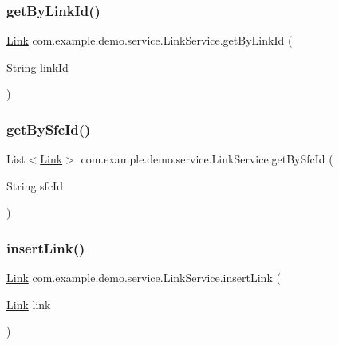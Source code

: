 \subsubsection{\texorpdfstring{get\+By\+Link\+Id()}{getByLinkId()}}
{\footnotesize\ttfamily \mbox{\hyperlink{classcom_1_1example_1_1demo_1_1modular_1_1_link}{Link}} com.\+example.\+demo.\+service.\+Link\+Service.\+get\+By\+Link\+Id (\begin{DoxyParamCaption}\item[{String}]{link\+Id }\end{DoxyParamCaption})}

\mbox{\label{classcom_1_1example_1_1demo_1_1service_1_1_link_service_a5b02639405e897a0f429ad1cc0e54990}} 
\subsubsection{\texorpdfstring{get\+By\+Sfc\+Id()}{getBySfcId()}}
{\footnotesize\ttfamily List$<$\mbox{\hyperlink{classcom_1_1example_1_1demo_1_1modular_1_1_link}{Link}}$>$ com.\+example.\+demo.\+service.\+Link\+Service.\+get\+By\+Sfc\+Id (\begin{DoxyParamCaption}\item[{String}]{sfc\+Id }\end{DoxyParamCaption})}

\mbox{\label{classcom_1_1example_1_1demo_1_1service_1_1_link_service_afac835ac1e256e3f541d5a38400a7047}} 
\subsubsection{\texorpdfstring{insert\+Link()}{insertLink()}}
{\footnotesize\ttfamily \mbox{\hyperlink{classcom_1_1example_1_1demo_1_1modular_1_1_link}{Link}} com.\+example.\+demo.\+service.\+Link\+Service.\+insert\+Link (\begin{DoxyParamCaption}\item[{\mbox{\hyperlink{classcom_1_1example_1_1demo_1_1modular_1_1_link}{Link}}}]{link }\end{DoxyParamCaption})}



